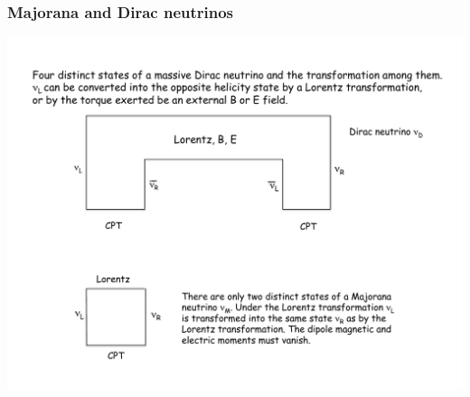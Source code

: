 \begin{frame}
\frametitle{Majorana and Dirac neutrinos}
\includegraphics[scale=0.4]{img/DiracVsMajorana2.pdf}


\end{frame}

